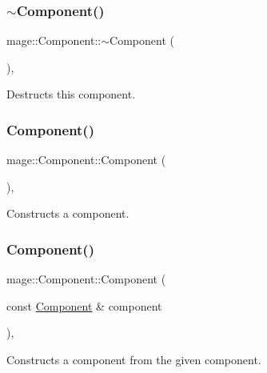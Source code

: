 \subsubsection{\texorpdfstring{$\sim$\+Component()}{~Component()}}
{\footnotesize\ttfamily mage\+::\+Component\+::$\sim$\+Component (\begin{DoxyParamCaption}{ }\end{DoxyParamCaption})\hspace{0.3cm}{\ttfamily [virtual]}, {\ttfamily [default]}}

Destructs this component. \hypertarget{classmage_1_1_component_aef66a6573c094143bf95d3a81df1098e}{}\label{classmage_1_1_component_aef66a6573c094143bf95d3a81df1098e} 
\subsubsection{\texorpdfstring{Component()}{Component()}\hspace{0.1cm}{\footnotesize\ttfamily [1/3]}}
{\footnotesize\ttfamily mage\+::\+Component\+::\+Component (\begin{DoxyParamCaption}{ }\end{DoxyParamCaption})\hspace{0.3cm}{\ttfamily [protected]}, {\ttfamily [noexcept]}}

Constructs a component. \hypertarget{classmage_1_1_component_abcd9e6ba7f9691f51d1802d5cf8a365a}{}\label{classmage_1_1_component_abcd9e6ba7f9691f51d1802d5cf8a365a} 
\subsubsection{\texorpdfstring{Component()}{Component()}\hspace{0.1cm}{\footnotesize\ttfamily [2/3]}}
{\footnotesize\ttfamily mage\+::\+Component\+::\+Component (\begin{DoxyParamCaption}\item[{const \hyperlink{classmage_1_1_component}{Component} \&}]{component }\end{DoxyParamCaption})\hspace{0.3cm}{\ttfamily [protected]}, {\ttfamily [noexcept]}}

Constructs a component from the given component.


